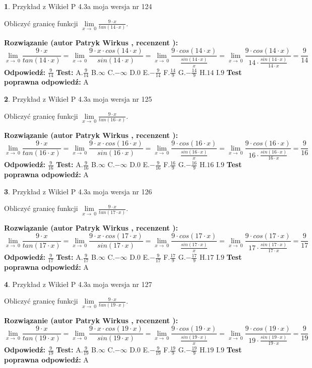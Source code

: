 \documentclass[12pt, a4paper]{article}
\theoremstyle{definition} %
\newtheorem{zad}{}
\newcommand{\zadStart}[1]{\begin{zad}#1\newline}
\newcommand{\zadStop}{\end{zad}}
\newcommand{\rozwStart}[2]{\noindent \textbf{Rozwiązanie (autor #1 , recenzent #2): }\newline}
\newcommand{\rozwStop}{\newline}
\newcommand{\odpStart}{\noindent \textbf{Odpowiedź:}\newline}
\newcommand{\odpStop}{\newline}
\newcommand{\testStart}{\noindent \textbf{Test:}\newline}
\newcommand{\testStop}{\newline}
\newcommand{\kluczStart}{\noindent \textbf{Test poprawna odpowiedź:}\newline}
\newcommand{\kluczStop}{\newline}
\begin{document}
\zadStart{Przykład z Wikieł P 4.3a moja wersja nr 124}


Obliczyć granicę funkcji $\lim\limits_{x\to\ 0}\frac{9 \cdot x}{tan(14 \cdot x)}$.
\zadStop
\rozwStart{Patryk Wirkus}{}
$$\lim\limits_{x\to\ 0}\frac{9 \cdot x}{tan(14 \cdot x)}=\lim\limits_{x\to\ 0}\frac{9 \cdot x \cdot cos(14 \cdot x)}{sin(14 \cdot x)}=\lim\limits_{x\to\ 0}\frac{9 \cdot cos(14 \cdot x)}{\frac{sin(14 \cdot x)}{x}}=\lim\limits_{x\to\ 0}\frac{9 \cdot cos(14 \cdot x)}{14 \cdot \frac{sin(14 \cdot x)}{14 \cdot x}} = \frac{9}{14}$$
\rozwStop
\odpStart
$\frac{9}{14}$
\odpStop
\testStart
A.$\frac{9}{14}$
B.$\infty$
C.$-\infty$
D.$0$
E.$-\frac{9}{14}$
F.$\frac{14}{9}$
G.$-\frac{14}{9}$
H.$14$
I.$9$
\testStop
\kluczStart
A
\kluczStop



\zadStart{Przykład z Wikieł P 4.3a moja wersja nr 125}


Obliczyć granicę funkcji $\lim\limits_{x\to\ 0}\frac{9 \cdot x}{tan(16 \cdot x)}$.
\zadStop
\rozwStart{Patryk Wirkus}{}
$$\lim\limits_{x\to\ 0}\frac{9 \cdot x}{tan(16 \cdot x)}=\lim\limits_{x\to\ 0}\frac{9 \cdot x \cdot cos(16 \cdot x)}{sin(16 \cdot x)}=\lim\limits_{x\to\ 0}\frac{9 \cdot cos(16 \cdot x)}{\frac{sin(16 \cdot x)}{x}}=\lim\limits_{x\to\ 0}\frac{9 \cdot cos(16 \cdot x)}{16 \cdot \frac{sin(16 \cdot x)}{16 \cdot x}} = \frac{9}{16}$$
\rozwStop
\odpStart
$\frac{9}{16}$
\odpStop
\testStart
A.$\frac{9}{16}$
B.$\infty$
C.$-\infty$
D.$0$
E.$-\frac{9}{16}$
F.$\frac{16}{9}$
G.$-\frac{16}{9}$
H.$16$
I.$9$
\testStop
\kluczStart
A
\kluczStop



\zadStart{Przykład z Wikieł P 4.3a moja wersja nr 126}


Obliczyć granicę funkcji $\lim\limits_{x\to\ 0}\frac{9 \cdot x}{tan(17 \cdot x)}$.
\zadStop
\rozwStart{Patryk Wirkus}{}
$$\lim\limits_{x\to\ 0}\frac{9 \cdot x}{tan(17 \cdot x)}=\lim\limits_{x\to\ 0}\frac{9 \cdot x \cdot cos(17 \cdot x)}{sin(17 \cdot x)}=\lim\limits_{x\to\ 0}\frac{9 \cdot cos(17 \cdot x)}{\frac{sin(17 \cdot x)}{x}}=\lim\limits_{x\to\ 0}\frac{9 \cdot cos(17 \cdot x)}{17 \cdot \frac{sin(17 \cdot x)}{17 \cdot x}} = \frac{9}{17}$$
\rozwStop
\odpStart
$\frac{9}{17}$
\odpStop
\testStart
A.$\frac{9}{17}$
B.$\infty$
C.$-\infty$
D.$0$
E.$-\frac{9}{17}$
F.$\frac{17}{9}$
G.$-\frac{17}{9}$
H.$17$
I.$9$
\testStop
\kluczStart
A
\kluczStop



\zadStart{Przykład z Wikieł P 4.3a moja wersja nr 127}


Obliczyć granicę funkcji $\lim\limits_{x\to\ 0}\frac{9 \cdot x}{tan(19 \cdot x)}$.
\zadStop
\rozwStart{Patryk Wirkus}{}
$$\lim\limits_{x\to\ 0}\frac{9 \cdot x}{tan(19 \cdot x)}=\lim\limits_{x\to\ 0}\frac{9 \cdot x \cdot cos(19 \cdot x)}{sin(19 \cdot x)}=\lim\limits_{x\to\ 0}\frac{9 \cdot cos(19 \cdot x)}{\frac{sin(19 \cdot x)}{x}}=\lim\limits_{x\to\ 0}\frac{9 \cdot cos(19 \cdot x)}{19 \cdot \frac{sin(19 \cdot x)}{19 \cdot x}} = \frac{9}{19}$$
\rozwStop
\odpStart
$\frac{9}{19}$
\odpStop
\testStart
A.$\frac{9}{19}$
B.$\infty$
C.$-\infty$
D.$0$
E.$-\frac{9}{19}$
F.$\frac{19}{9}$
G.$-\frac{19}{9}$
H.$19$
I.$9$
\testStop
\kluczStart
A
\kluczStop
\end{document}
